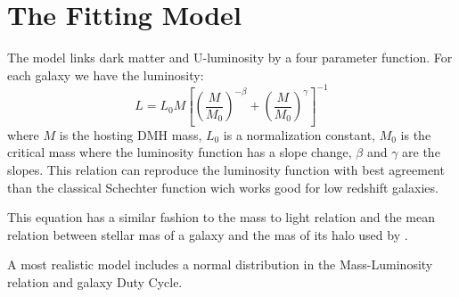 \section{The Fitting Model}
The model links dark matter and U-luminosity by a four parameter function.
For each galaxy we have the luminosity:
  \begin{equation}
  L = L_{0} M \left[ \left( \frac{M}{M_0}\right)^{-\beta} 
		   + \left( \frac{M}{M_0}\right)^{\gamma} 
               \right]^{-1}
  \end{equation}
where $M$ is the hosting DMH mass, $L_{0}$ is a normalization constant, $M_0$
is the critical mass where the luminosity function has a slope change, 
$\beta$ and $\gamma$ are the slopes.
This relation can reproduce the luminosity function with best agreement than the classical Schechter function wich works good for low redshift galaxies.

This equation has a similar fashion to the mass to light relation \citep{vandenbosch03} and the mean relation between stellar mas of a galaxy and the mas of its halo used by \cite{moster10}.

A most realistic model includes a normal distribution in the Mass-Luminosity relation and galaxy Duty Cycle. \citep{lee09}